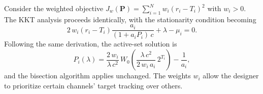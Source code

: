 \documentclass[journal]{IEEEtran}
\begin{document}
Consider the weighted objective $J_w(\bm{P}) = \sum_{i=1}^{N} w_i (r_i - T_i)^2$ with $w_i > 0$.
The KKT analysis proceeds identically, with the stationarity condition becoming
\begin{equation}
2\,w_i(r_i - T_i)\frac{a_i}{(1+a_iP_i)\,c} + \lambda - \mu_i = 0.
\end{equation}
Following the same derivation, the active-set solution is
\begin{equation}
P_i(\lambda) = \frac{2\,w_i}{\lambda\, c^2}\, W_0\!\left(\frac{\lambda\, c^2}{2\,w_i\, a_i}\, 2^{T_i}\right) - \frac{1}{a_i},
\end{equation}
and the bisection algorithm applies unchanged.
The weights $w_i$ allow the designer to prioritize certain channels' target tracking over others.



\end{document}
